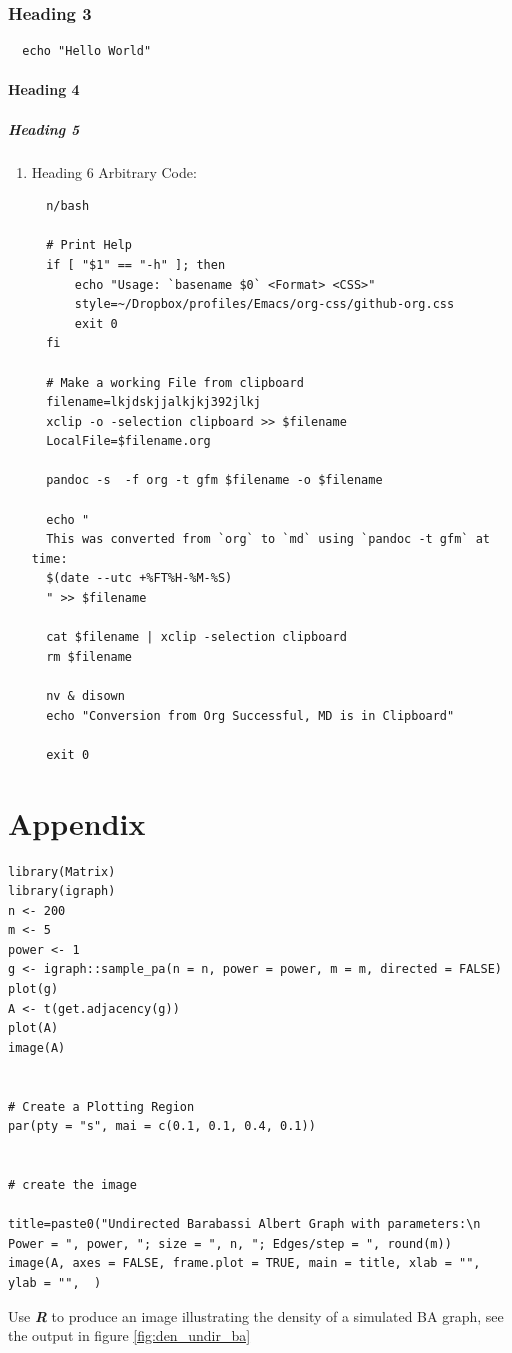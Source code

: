 \documentclass[11pt]{article}
\begin{document}
\subsubsection{Heading 3}
\label{heading-3}
\begin{verbatim}
  echo "Hello World"
\end{verbatim}


\paragraph{Heading 4}
\label{heading-4}
\subparagraph{Heading 5}
\label{heading-5}
\begin{enumerate}
\item Heading 6
\label{heading-6}
Arbitrary Code:

\begin{verbatim}
  n/bash

  # Print Help
  if [ "$1" == "-h" ]; then
      echo "Usage: `basename $0` <Format> <CSS>"
      style=~/Dropbox/profiles/Emacs/org-css/github-org.css
      exit 0
  fi

  # Make a working File from clipboard
  filename=lkjdskjjalkjkj392jlkj
  xclip -o -selection clipboard >> $filename
  LocalFile=$filename.org

  pandoc -s  -f org -t gfm $filename -o $filename

  echo "
  This was converted from `org` to `md` using `pandoc -t gfm` at time:
  $(date --utc +%FT%H-%M-%S)
  " >> $filename

  cat $filename | xclip -selection clipboard
  rm $filename

  nv & disown
  echo "Conversion from Org Successful, MD is in Clipboard"

  exit 0
\end{verbatim}
\end{enumerate}
\section{Appendix}
\label{sec:orga6bfb6e}

\begin{listing}[htbp]
\begin{verbatim}
library(Matrix)
library(igraph)
n <- 200
m <- 5
power <- 1
g <- igraph::sample_pa(n = n, power = power, m = m, directed = FALSE)
plot(g)
A <- t(get.adjacency(g))
plot(A)
image(A)


# Create a Plotting Region
par(pty = "s", mai = c(0.1, 0.1, 0.4, 0.1))


# create the image

title=paste0("Undirected Barabassi Albert Graph with parameters:\n Power = ", power, "; size = ", n, "; Edges/step = ", round(m))
image(A, axes = FALSE, frame.plot = TRUE, main = title, xlab = "", ylab = "",  )
\end{verbatim}
\caption{\label{r-den_undir_ba}Use \textbf{\emph{R}} to produce an image illustrating the density of a simulated BA graph, see the output in figure \ref{fig:den_undir_ba}}
\end{listing}
\end{document}
